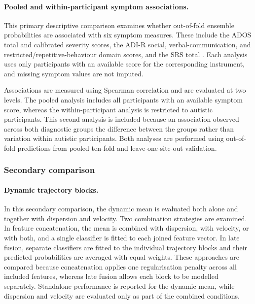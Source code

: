 \paragraph{\textbf{Pooled and within-participant symptom associations.}}
\label{par:symptom-associations}
This primary descriptive comparison examines whether out-of-fold ensemble probabilities are associated with six symptom measures. These include the ADOS total and calibrated severity scores, the ADI-R social, verbal-communication, and restricted/repetitive-behaviour domain scores, and the SRS total \citep{Lordetal1994,Lordetal2000}. Each analysis uses only participants with an available score for the corresponding instrument, and missing symptom values are not imputed.

Associations are measured using Spearman correlation and are evaluated at two levels. The pooled analysis includes all participants with an available symptom score, whereas the within-participant analysis is restricted to autistic participants. This second analysis is included because an association observed across both diagnostic groups  the difference between the groups rather than variation within autistic participants. Both analyses are performed using out-of-fold predictions from pooled ten-fold and leave-one-site-out validation.



\subsubsection{Secondary comparison}
\label{subsubsec:secondary-comparisons}

\paragraph{\textbf{Dynamic trajectory blocks.}}
\label{par:trajectory-blocks}
In this secondary comparison, the dynamic mean is evaluated both alone and together with dispersion and velocity. Two combination strategies are examined. In feature concatenation, the mean is combined with dispersion, with velocity, or with both, and a single classifier is fitted to each joined feature vector. In late fusion, separate classifiers are fitted to the individual trajectory blocks and their predicted probabilities are averaged with equal weights. These approaches are compared because concatenation applies one regularisation penalty across all included features, whereas late fusion allows each block to be modelled separately. Standalone performance is reported for the dynamic mean, while dispersion and velocity are evaluated only as part of the combined conditions.

